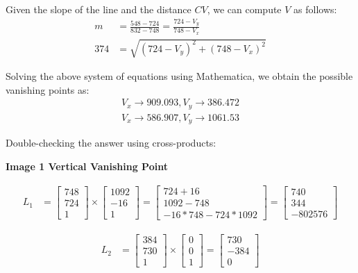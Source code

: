 \documentclass[12pt, oneside]{article}
\begin{document}
Given the slope of the line and the distance $CV$, we can compute $V$ as follows:
\begin{align}
    m &= \frac{548-724}{832-748} = \frac{724-V_y}{748 - V_x}  \\
    374 &= \sqrt{(724-V_y)^2 + (748 - V_x)^2}
\end{align}

Solving the above system of equations using Mathematica, we obtain the possible
vanishing points as:
\begin{align*}
    {V_x\to 909.093,V_y\to 386.472} \\
    {V_x\to 586.907,V_y\to 1061.53} 
\end{align*}

Double-checking the answer using cross-products:

\textbf{Image 1 Vertical Vanishing Point}

\begin{align*}
L_1 &=    \begin{bmatrix}
            748 \\
            724 \\
            1
        \end{bmatrix} \times 
        \begin{bmatrix}
            1092 \\
            -16 \\
            1
        \end{bmatrix}  = 
        \begin{bmatrix}
            724 + 16 \\
            1092 - 748 \\
            -16*748 - 724*1092
        \end{bmatrix} = 
        \begin{bmatrix}
            740  \\
            344 \\
            -802576 
        \end{bmatrix}                                                   
\end{align*}

\begin{align*}
L_2 &=    \begin{bmatrix}
            384 \\
            730 \\
            1
        \end{bmatrix} \times 
        \begin{bmatrix}
            0 \\
            0 \\
            1
        \end{bmatrix}  = 
        \begin{bmatrix}
            730  \\
            -384 \\
            0 
        \end{bmatrix}                                                   
\end{align*}
\end{document}
